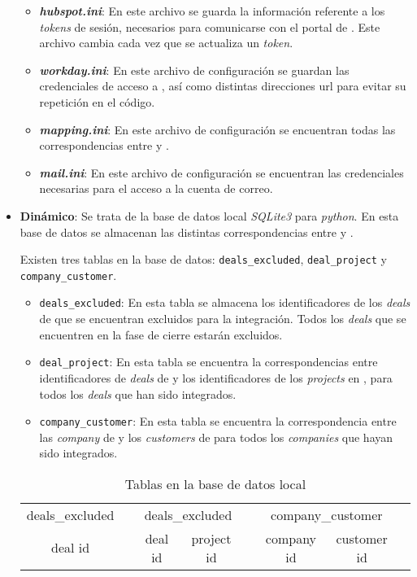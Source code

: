 \begin{itemize}[leftmargin=*]
\begin{itemize}
	\item [\textendash] \textbf{\textit{hubspot.ini}}: En este archivo se guarda la información referente a los \textit{tokens} de sesión, necesarios para comunicarse con el portal de \hs. 
	Este archivo cambia cada vez que se actualiza un \textit{token}.
	\item [\textendash] \textbf{\textit{workday.ini}}: En este archivo de configuración se 
	guardan las credenciales de acceso a \wday{}, así como distintas direcciones url para evitar su repetición en el código.
	\item [\textendash] \textbf{\textit{mapping.ini}}: En este archivo de configuración se encuentran todas las correspondencias entre \hs{} y \wday.
	\item [\textendash] \textbf{\textit{mail.ini}}: En este archivo de configuración se encuentran las credenciales necesarias para el acceso a la cuenta de correo.
\end{itemize}




\item \textbf{Dinámico}: Se trata de la base de datos local \textit{SQLite3} \cite{sqlite3} para \textit{python}.
 En esta base de datos se almacenan las distintas correspondencias entre \hs{} y \wday.
 
 Existen tres tablas en la base de datos: \texttt{deals\_excluded}, \texttt{deal\_project} y \texttt{company\_customer}.
 
 
 \begin{itemize}
	\item \texttt{deals\_excluded}: En esta tabla se almacena los identificadores de los \textit{deals} de \hs{} 
	que se encuentran excluidos para la integración. Todos los \textit{deals} que se encuentren en la fase de
	cierre estarán excluidos.
	\item \texttt{deal\_project}: En esta tabla se encuentra la correspondencias entre identificadores 
	de \textit{deals} de \hs{} y los identificadores de los \textit{projects} en \wday{}, para todos los \textit{deals} que han sido integrados.
	\item \texttt{company\_customer}: En esta tabla se encuentra la correspondencia entre las \textit{company} de \hs{} y los \textit{customers} de \wday{}
	para todos los \textit{companies} que hayan sido integrados.
 \end{itemize}
 

\begin{table}[H]
		\centering
		\begin{tabular}{
		|c|c@{\hskip 1cm} 
		|c|c|c@{\hskip 1cm} 
		|c|c|c@{\hskip 1cm}
		}
		\cline{1-1}\cline{3-4}\cline{6-7}
		deals\_excluded && \multicolumn{2}{c|}{deals\_excluded} && \multicolumn{2}{c|}{company\_customer} \\
	\cline{1-1}\cline{3-4}\cline{6-7}
	deal id && deal id & project id && company id & customer id \\
	\cline{1-1}\cline{3-4}\cline{6-7}
	\end{tabular}
	\caption{Tablas en la base de datos local}
	\label{tab:tables}
\end{table}


\end{itemize}
